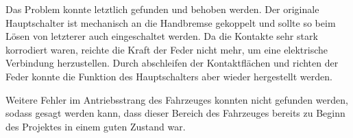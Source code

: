 Das Problem konnte letztlich gefunden und behoben werden. Der originale Hauptschalter ist mechanisch an die Handbremse gekoppelt und sollte so beim Lösen von letzterer auch eingeschaltet werden. Da die Kontakte sehr stark korrodiert waren, reichte die Kraft der Feder nicht mehr, um eine elektrische Verbindung herzustellen. Durch abschleifen der Kontaktflächen und richten der Feder konnte die Funktion des Hauptschalters aber wieder hergestellt werden.

Weitere Fehler im Antriebsstrang des Fahrzeuges konnten nicht gefunden werden, sodass gesagt werden kann, dass dieser Bereich des Fahrzeuges bereits zu Beginn des Projektes in einem guten Zustand war.




\newpage